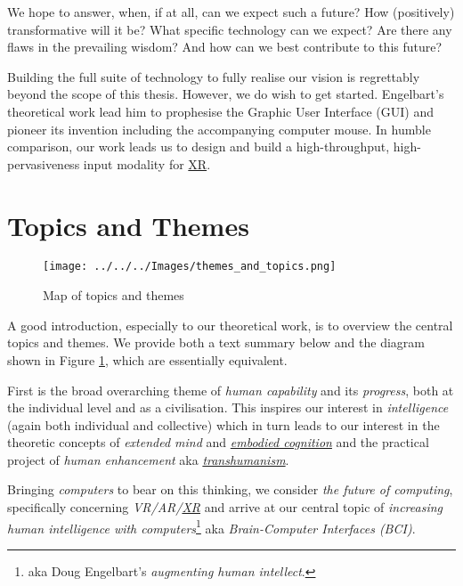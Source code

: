 \documentclass[logo,bsc,singlespacing,parskip]{infthesis}
\begin{document}
We hope to answer, when, if at all, can we expect such a future?
How (positively) transformative will it be?
What specific technology can we expect?
Are there any flaws in the prevailing wisdom? 
And how can we best contribute to this future?

Building the full suite of technology to fully realise our vision is regrettably beyond the scope of this thesis.
However, we do wish to get started.
Engelbart's theoretical work \autocite{engelbartAugmentingHumanIntellect1962}  lead him to prophesise the Graphic User Interface (GUI) and pioneer its invention including the accompanying computer mouse.
In humble comparison, our work leads us to design and build a high-throughput, high-pervasiveness input modality for \hyperref[org1d567af]{XR}.

\chapter*{Topics and Themes}
\label{sec:org34302a0}
\begin{figure}[h]
\centering
\texttt{[image: ../../../Images/themes\_and\_topics.png]}
\caption{\label{fig:topics_themes}Map of topics and themes}
\end{figure}

A good introduction, especially to our theoretical work, is to overview the central topics and themes.
We provide both a text summary below and the diagram shown in Figure \ref{fig:topics_themes}, which are essentially equivalent.

First is the broad overarching theme of \emph{human capability} and its \emph{progress}, both at the individual level and as a civilisation.
This inspires our interest in \emph{intelligence} (again both individual and collective) which in turn leads to our interest in
the theoretic concepts of \emph{extended mind} and \emph{\hyperref[orgcc8d0dd]{embodied cognition}} and the practical project of \emph{human enhancement} aka \emph{\hyperref[org7147a42]{transhumanism}}.

Bringing \emph{computers} to bear on this thinking, we consider \emph{the future of computing}, specifically concerning \emph{VR/AR/\hyperref[org1d567af]{XR}} and arrive at our central topic of \emph{increasing human intelligence with computers}\footnote{aka Doug Engelbart's \emph{augmenting human intellect}.} aka \emph{Brain-Computer Interfaces (BCI)}.
\end{document}
